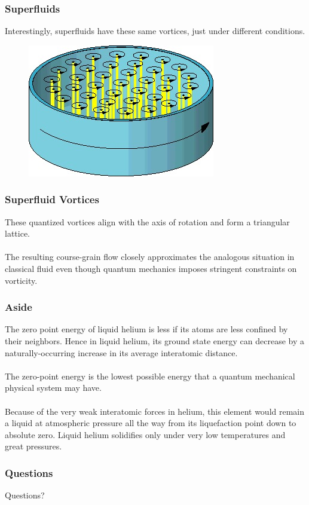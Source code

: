 \documentclass[10pt]{beamer}
\theoremstyle{definition}
\begin{document}
\begin{frame}[<+->]
    \frametitle{Superfluids}

    Interestingly, superfluids have these same vortices, just under different
    conditions.

    \begin{figure}
    \begin{center}
        \includegraphics[scale=0.006]{superfluidvort}
    \end{center}
    \end{figure}

\end{frame}


\begin{frame}
    \frametitle{Superfluid Vortices}

    These quantized vortices align with the axis of rotation and form a
    triangular lattice.
    \\~\\

    The resulting course-grain flow closely approximates the analogous
    situation in classical fluid even though quantum mechanics imposes
    stringent constraints on vorticity.

\end{frame}


\begin{frame}
    \frametitle{Aside}

    The zero point energy of liquid helium is less if its atoms are less 
    confined by their neighbors. Hence in liquid helium, its ground 
    state energy can decrease by a naturally-occurring increase in 
    its average interatomic distance.
    \\~\\
    The zero-point energy is the lowest possible energy that a 
    quantum mechanical physical system may have.
    \\~\\
    Because of the very weak interatomic forces in helium, this element 
    would remain a liquid at atmospheric pressure all the way from its 
    liquefaction point down to absolute zero. Liquid helium solidifies 
    only under very low temperatures and great pressures.
\end{frame}





\begin{frame}
    \frametitle{Questions}

    Questions?


\end{frame}
\end{document}
